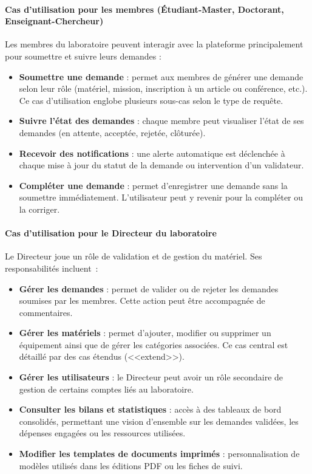 \paragraph{Cas d’utilisation pour les membres (Étudiant-Master, Doctorant, Enseignant-Chercheur)}

Les membres du laboratoire peuvent interagir avec la plateforme principalement pour soumettre et suivre leurs demandes :

\begin{itemize}
\item \textbf{Soumettre une demande} : permet aux membres de générer une demande selon leur rôle (matériel, mission, inscription à un article ou conférence, etc.). Ce cas d’utilisation englobe plusieurs sous-cas selon le type de requête.
\item \textbf{Suivre l’état des demandes} : chaque membre peut visualiser l’état de ses demandes (en attente, acceptée, rejetée, clôturée).
\item \textbf{Recevoir des notifications} : une alerte automatique est déclenchée à chaque mise à jour du statut de la demande ou intervention d’un validateur.
\item \textbf{Compléter une demande} : permet d’enregistrer une demande sans la soumettre immédiatement. L’utilisateur peut y revenir pour la compléter ou la corriger.
\end{itemize}

\paragraph{Cas d’utilisation pour le Directeur du laboratoire}

Le Directeur joue un rôle de validation et de gestion du matériel. Ses responsabilités incluent :

\begin{itemize}
\item \textbf{Gérer les demandes} : permet de valider ou de rejeter les demandes soumises par les membres. Cette action peut être accompagnée de commentaires.
\item \textbf{Gérer les matériels} : permet d’ajouter, modifier ou supprimer un équipement ainsi que de gérer les catégories associées. Ce cas central est détaillé par des cas étendus (<<extend>>).
\item \textbf{Gérer les utilisateurs} : le Directeur peut avoir un rôle secondaire de gestion de certains comptes liés au laboratoire.
\item \textbf{Consulter les bilans et statistiques} : accès à des tableaux de bord consolidés, permettant une vision d’ensemble sur les demandes validées, les dépenses engagées ou les ressources utilisées.
\item \textbf{Modifier les templates de documents imprimés} : personnalisation de modèles utilisés dans les éditions PDF ou les fiches de suivi.
\end{itemize}

